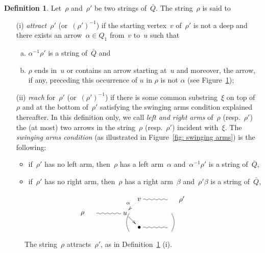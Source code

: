 \documentclass{amsart}
\theoremstyle{definition}
\newtheorem{definition}[theorem]{Definition}
\newcommand{\darkblue}{\color{darkblue}} %
\newcommand{\defn}[1]{\textsl{\darkblue #1}} %
\begin{document}
\begin{definition}
\label{definition: dance and attract}
Let~$\rho$ and~$\rho'$ be two strings of~$\bar Q$. The string~$\rho$ is said to
\begin{itemize}
\item[(i)] \defn{attract}~$\rho'$ (or~$(\rho')^{-1}$) if the starting vertex~$v$ of~$\rho'$ is not a deep and there exists an arrow~$\alpha \in Q_1$ from~$v$ to~$u$ such that
	\begin{enumerate}[(a)]
	\item $\alpha^{-1}\rho'$ is a string of~$\bar Q$ and
	\item $\rho$ ends in~$u$ or contains an arrow starting at~$u$ and moreover, the arrow, if any, preceding this occurrence of $u$ in $\rho$ is not $\alpha$ (see Figure~\ref{fig:def-attracts});
	\end{enumerate}
\item[(ii)] \defn{reach} for~$\rho'$ (or~$(\rho')^{-1}$) if there is some common substring~$\xi$ on top of~$\rho$ and at the bottom of~$\rho'$ satisfying the swinging arms condition explained thereafter. In this definition only, we call \defn{left and right arms} of~$\rho$ (resp.~$\rho'$) the (at most) two arrows in the string~$\rho$ (resp.~$\rho'$) incident with~$\xi$. The \defn{swinging arms condition} (as illustrated in Figure~\ref{fig: swinging arms}) is the following: 
\begin{itemize}
\item if~$\rho'$ has no left arm, then~$\rho$ has a left arm~$\alpha$ and~$\alpha^{-1}\rho'$ is a string of~$\bar Q$,
\item if~$\rho'$ has no right arm, then~$\rho$ has a right arm~$\beta$ and~$\rho'\beta$ is a string of~$\bar Q$,
\end{itemize}
\end{itemize}
\begin{figure}[t]
 	\capstart
\[
\xy
%
(28,7)*+{v}="14";
(42,7)="16";
(49,7)*+{\rho'}="17";
%
(0,0)*+{\rho}="0";
(7,0)="1";
(21,0)*+{u}="3";
%
(28,-7)*+{\bullet}="-4";
(42,-7)="-6";
%
{\ar@{~} "1";"3"};
{\ar "3";"-4"};
{\ar@{~} "-4";"-6"};
%
{\ar@{~} "14";"16"};
%
{\ar@{..>}_{\alpha} "14";"3"};
%
{\ar@/_.3pc/@{-} (23,0);(23,-9)};
{\ar@/^.3pc/@{-} (44,0);(44,-9)};
%
\endxy
\]
	\caption{The string~$\rho$ attracts~$\rho'$, as in Definition~\ref{definition: dance and attract} (i).}
	\label{fig:def-attracts}
\end{figure}


\end{definition}
\end{document}
